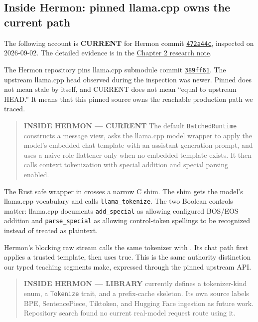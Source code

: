 \documentclass[
  10pt,
]{article}
\begin{document}
\subsection{Inside Hermon: pinned llama.cpp owns the current
path}\label{inside-hermon-pinned-llama.cpp-owns-the-current-path}

The following account is \textbf{CURRENT} for Hermon commit
\href{https://github.com/hermonai/hermon/commit/472a44cdb511b2dae6c9569e59543db8f8350b25}{\texttt{472a44c}},
inspected on 2026-09-02. The detailed evidence is in the
\href{https://github.com/hermonai/inside-the-llm-engine/blob/astra-visual-rewrite/research/part-01/chapter-02-from-text-to-tokens.md}{Chapter
2 research note}.

The Hermon repository pins llama.cpp submodule commit
\href{https://github.com/ggml-org/llama.cpp/commit/389ff61d77b5c71cec0cf92fe4e5d01ace80b797}{\texttt{389ff61}}.
The upstream llama.cpp head observed during the inspection was newer.
Pinned does not mean stale by itself, and CURRENT does not mean ``equal
to upstream HEAD.'' It means that this pinned source owns the reachable
production path we traced.

\begin{quote}
\textbf{INSIDE HERMON --- CURRENT} The default \texttt{BatchedRuntime}
constructs a message view, asks the llama.cpp model wrapper to apply the
model's embedded chat template with an assistant generation prompt, and
uses a naive role flattener only when no embedded template exists. It
then calls context tokenization with special addition and special
parsing enabled.
\end{quote}

The Rust safe wrapper in
\texttt{} crosses a narrow C
shim. The shim gets the model's llama.cpp vocabulary and calls
\texttt{llama\_tokenize}. The two Boolean controls matter: llama.cpp
documents \texttt{add\_special} as allowing configured BOS/EOS addition
and \texttt{parse\_special} as allowing control-token spellings to be
recognized instead of treated as plaintext.

Hermon's blocking raw stream calls the same tokenizer with
\texttt{}. Its chat path first applies a
trusted template, then uses true. This is the same authority distinction
our typed teaching segments make, expressed through the pinned upstream
API.

\begin{quote}
\textbf{INSIDE HERMON --- LIBRARY}
\texttt{} currently defines a
tokenizer-kind enum, a \texttt{Tokenize} trait, and a prefix-cache
skeleton. Its own source labels BPE, SentencePiece, Tiktoken, and
Hugging Face ingestion as future work. Repository search found no
current real-model request route using it.
\end{quote}
\end{document}
